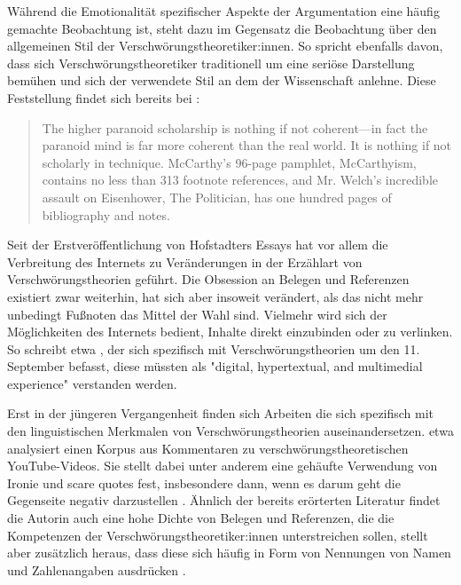 Während die Emotionalität spezifischer Aspekte der Argumentation eine häufig gemachte Beobachtung ist, steht dazu im Gegensatz die Beobachtung über den allgemeinen Stil der Verschwörungstheoretiker:innen.
So spricht ebenfalls \textcite[][61]{butter_2018} davon, dass sich Verschwörungstheoretiker traditionell um eine seriöse Darstellung bemühen und sich der verwendete Stil an dem der Wissenschaft anlehne.
Diese Feststellung findet sich bereits bei \textcite{hofstadter_2008}:

\begin{quotation}
    The higher paranoid scholarship is nothing if not coherent—in fact the paranoid mind is far more coherent than the real world. It is nothing if not scholarly in technique. McCarthy’s 96-page pamphlet, McCarthyism, contains no less than 313 footnote references, and Mr. Welch’s incredible assault on Eisenhower, The Politician, has one hundred pages of bibliography and notes. \parencite[][37]{hofstadter_2008}
\end{quotation}

Seit der Erstveröffentlichung von Hofstadters Essays hat vor allem die Verbreitung des Internets zu Veränderungen in der Erzählart von Verschwörungstheorien geführt.
Die Obsession an Belegen und Referenzen existiert zwar weiterhin, hat sich aber insoweit verändert, als das nicht mehr unbedingt Fußnoten das Mittel der Wahl sind.
Vielmehr wird sich der Möglichkeiten des Internets bedient, Inhalte direkt einzubinden oder zu verlinken.
So schreibt etwa \textcite{soukup_2008}, der sich spezifisch mit Verschwörungstheorien um den 11. September befasst, diese müssten als "digital, hypertextual, and multimedial experience" \parencite[10]{soukup_2008} verstanden werden.

Erst in der jüngeren Vergangenheit finden sich Arbeiten die sich spezifisch mit den linguistischen Merkmalen von Verschwörungstheorien auseinandersetzen.
\textcite{schafer_2018} etwa analysiert einen Korpus aus Kommentaren zu verschwörungstheoretischen YouTube-Videos.
Sie stellt dabei unter anderem eine gehäufte Verwendung von Ironie und scare quotes fest, insbesondere dann, wenn es darum geht die Gegenseite negativ darzustellen \parencite[235]{schafer_2018}.
Ähnlich der bereits erörterten Literatur findet die Autorin auch eine hohe Dichte von Belegen und Referenzen, die die Kompetenzen der Verschwörungstheoretiker:innen unterstreichen sollen, stellt aber zusätzlich heraus, dass diese sich häufig in Form von Nennungen von Namen und Zahlenangaben ausdrücken \parencite[234]{schafer_2018}.

